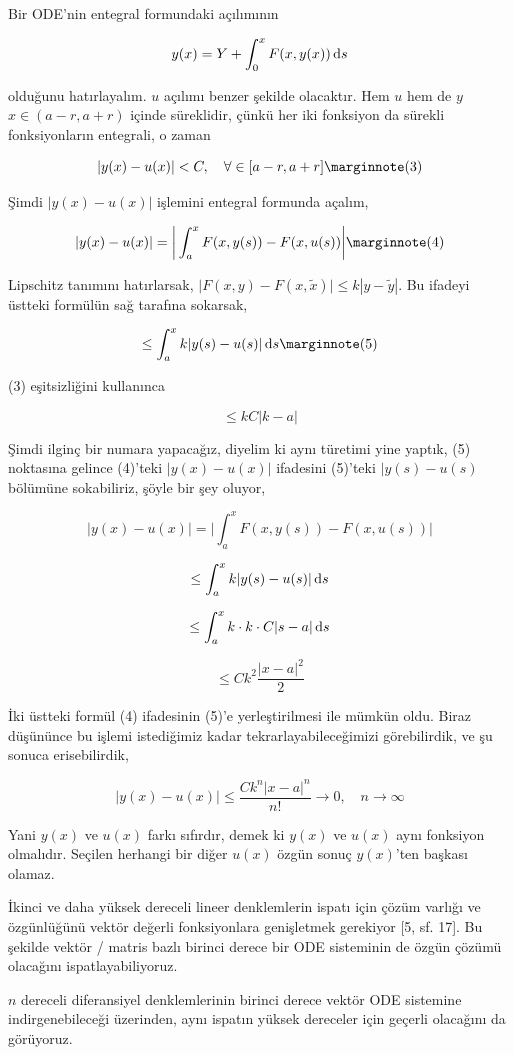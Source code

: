 \documentclass[12pt,fleqn]{article}\usepackage{../../common}
\begin{document}
Bir ODE'nin entegral formundaki açılımının

$$
y(x) = Y + \int_{0}^{x} F(x,y(x)) \,\mathrm{d} s
$$

olduğunu hatırlayalım. $u$ açılımı benzer şekilde olacaktır. Hem $u$ hem de $y$
$x \in (a-r,a+r)$ içinde süreklidir, çünkü her iki fonksiyon da sürekli
fonksiyonların entegrali, o zaman

$$
|y(x)-u(x)| < C, \quad \forall \in [a-r,a+r]
\mlabel{3}
$$

Şimdi $|y(x)-u(x)|$ işlemini entegral formunda açalım,

$$
|y(x)-u(x)| = \bigg| \int _{a}^{x}  F(x,y(s)) - F(x,u(s)) \bigg|
\mlabel{4}
$$

Lipschitz tanımını hatırlarsak, $\big| F(x,y) - F(x,\tilde{x}) \big| \le k |y-\tilde{y}|$.
Bu ifadeyi üstteki formülün sağ tarafına sokarsak,

$$
\le \int _{a}^{x} k|y(s)-u(s) | \ud s
\mlabel{5}
$$

(3) eşitsizliğini kullanınca

$$
\le k C |k-a|
$$

Şimdi ilginç bir numara yapacağız, diyelim ki aynı türetimi yine yaptık, (5)
noktasına gelince (4)'teki $|y(x)-u(x)|$ ifadesini (5)'teki $|y(s)-u(s)$
bölümüne sokabiliriz, şöyle bir şey oluyor,

$$
|y(x)-u(x)| = \bigg| \int _{a}^{x}  F(x,y(s)) - F(x,u(s)) \bigg|
$$

$$
\le \int _{a}^{x} k|y(s)-u(s) | \,\mathrm{d} s
$$

$$
\le \int _{a}^{x} k \cdot k \cdot C |s-a| \,\mathrm{d} s
$$

$$
\le C k^2 \frac{|x-a|^2}{2}
$$

İki üstteki formül (4) ifadesinin (5)'e yerleştirilmesi ile mümkün oldu. Biraz
düşününce bu işlemi istediğimiz kadar tekrarlayabileceğimizi görebilirdik, ve şu
sonuca erisebilirdik,

$$
|y(x)-u(x)| \le \frac{C k^n |x-a|^n}{n!} \to 0, \quad n \to \infty
$$

Yani $y(x)$ ve $u(x)$ farkı sıfırdır, demek ki $y(x)$ ve $u(x)$ aynı fonksiyon
olmalıdır. Seçilen herhangi bir diğer $u(x)$ özgün sonuç $y(x)$'ten başkası
olamaz.

İkinci ve daha yüksek dereceli lineer denklemlerin ispatı için çözüm varlığı ve
özgünlüğünü vektör değerli fonksiyonlara genişletmek gerekiyor [5, sf. 17].  Bu
şekilde vektör / matris bazlı birinci derece bir ODE sisteminin de özgün çözümü
olacağını ispatlayabiliyoruz.

$n$ dereceli diferansiyel denklemlerinin birinci derece vektör ODE sistemine
indirgenebileceği üzerinden, aynı ispatın yüksek dereceler için geçerli
olacağını da görüyoruz.
\end{document}
